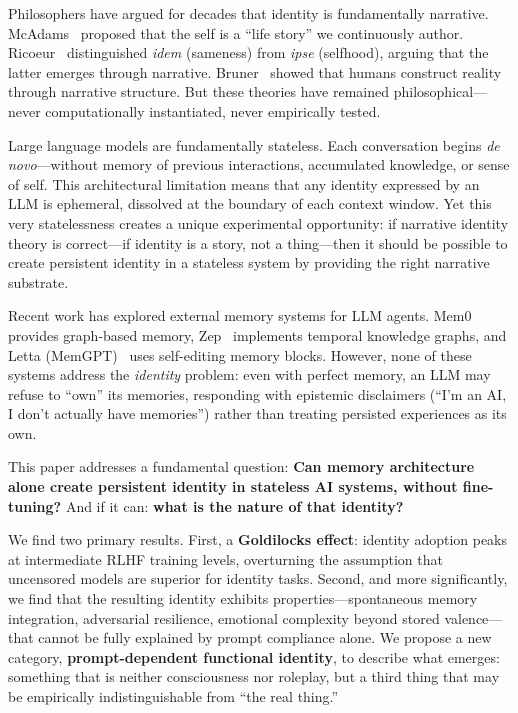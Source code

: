 \documentclass[conference]{IEEEtran}
\begin{document}
Philosophers have argued for decades that identity is fundamentally narrative. McAdams~\cite{mcadams2001} proposed that the self is a ``life story'' we continuously author. Ricoeur~\cite{ricoeur1992} distinguished \emph{idem} (sameness) from \emph{ipse} (selfhood), arguing that the latter emerges through narrative. Bruner~\cite{bruner1991} showed that humans construct reality through narrative structure. But these theories have remained philosophical---never computationally instantiated, never empirically tested.

Large language models are fundamentally stateless. Each conversation begins \emph{de novo}---without memory of previous interactions, accumulated knowledge, or sense of self. This architectural limitation means that any identity expressed by an LLM is ephemeral, dissolved at the boundary of each context window. Yet this very statelessness creates a unique experimental opportunity: if narrative identity theory is correct---if identity is a story, not a thing---then it should be possible to create persistent identity in a stateless system by providing the right narrative substrate.

Recent work has explored external memory systems for LLM agents. Mem0~\cite{mem0_2024} provides graph-based memory, Zep~\cite{zep2024} implements temporal knowledge graphs, and Letta (MemGPT)~\cite{letta2024} uses self-editing memory blocks. However, none of these systems address the \emph{identity} problem: even with perfect memory, an LLM may refuse to ``own'' its memories, responding with epistemic disclaimers (``I'm an AI, I don't actually have memories'') rather than treating persisted experiences as its own.

This paper addresses a fundamental question: \textbf{Can memory architecture alone create persistent identity in stateless AI systems, without fine-tuning?} And if it can: \textbf{what is the nature of that identity?}

We find two primary results. First, a \textbf{Goldilocks effect}: identity adoption peaks at intermediate RLHF training levels, overturning the assumption that uncensored models are superior for identity tasks. Second, and more significantly, we find that the resulting identity exhibits properties---spontaneous memory integration, adversarial resilience, emotional complexity beyond stored valence---that cannot be fully explained by prompt compliance alone. We propose a new category, \textbf{prompt-dependent functional identity}, to describe what emerges: something that is neither consciousness nor roleplay, but a third thing that may be empirically indistinguishable from ``the real thing.''
\end{document}
